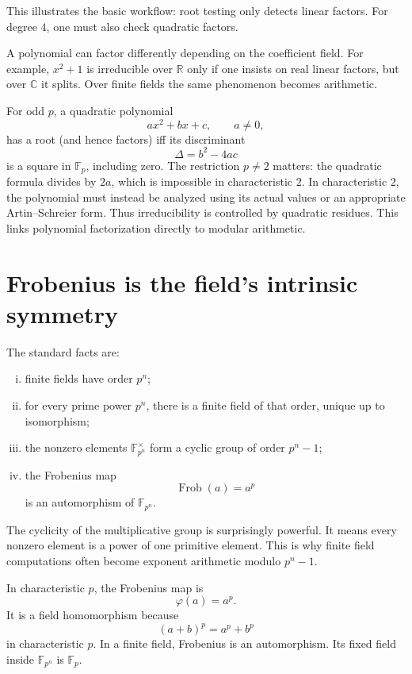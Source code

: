 This illustrates the basic workflow: root testing only detects linear factors.  For degree \(4\), one must also check quadratic factors.

A polynomial can factor differently depending on the coefficient field.  For example, \(x^2+1\) is irreducible over \(\mathbb R\) only if one insists on real linear factors, but over \(\mathbb C\) it splits.  Over finite fields the same phenomenon becomes arithmetic.

For odd \(p\), a quadratic polynomial
\[
  ax^2+bx+c,\qquad a\ne0,
\]
has a root (and hence factors) iff its discriminant
\[
  \Delta=b^2-4ac
\]
is a square in \(\mathbb F_p\), including zero. The restriction \(p\ne2\) matters: the quadratic formula divides by \(2a\), which is impossible in characteristic \(2\). In characteristic \(2\), the polynomial must instead be analyzed using its actual values or an appropriate Artin--Schreier form.  Thus irreducibility is controlled by quadratic residues.  This links polynomial factorization directly to modular arithmetic.

\section{Frobenius is the field's intrinsic symmetry}

The standard facts are:
\begin{enumerate}[(i)]
  \item finite fields have order \(p^n\);
  \item for every prime power \(p^n\), there is a finite field of that order, unique up to isomorphism;
  \item the nonzero elements \(\mathbb F_{p^n}^\times\) form a cyclic group of order \(p^n-1\);
  \item the Frobenius map
  \[
    \operatorname{Frob}(a)=a^p
  \]
  is an automorphism of \(\mathbb F_{p^n}\).

\end{enumerate}

The cyclicity of the multiplicative group is surprisingly powerful.  It means every nonzero element is a power of one primitive element.  This is why finite field computations often become exponent arithmetic modulo \(p^n-1\).

In characteristic \(p\), the Frobenius map is
\[
  \varphi(a)=a^p.
\]
It is a field homomorphism because
\[
  (a+b)^p=a^p+b^p
\]
in characteristic \(p\).  In a finite field, Frobenius is an automorphism.  Its fixed field inside \(\mathbb F_{p^n}\) is \(\mathbb F_p\).

